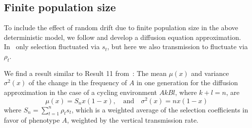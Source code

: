 \documentclass[12pt]{extarticle} %
\makeatletter
\renewcommand\section{\@startsection {section}{1}{\z@}%
     {-2.5ex \@plus -1ex \@minus -.2ex}%
     {1.3ex \@plus.2ex}%
    {\Large\bfseries}}
\makeatother
\begin{document}
\subsection*{Finite population size}

To include the effect of random drift due to finite population size in the above deterministic model, we follow \citet{Ram2018} and develop a diffusion equation approximation.
In~\citet{Ram2018} only selection fluctuated via $s_t$, but here we also transmission to fluctuate via $\rho_t$. 

We find a result similar to Result 11 from~\citet{Ram2018}:
The mean $\mu(x)$ and variance $\sigma^2(x)$ of the change in the frequency of $A$ in one generation for the diffusion approximation in the case of a cycling environment $AkBl$, where $k+l=n$, are
\begin{equation}
\mu(x) = S_n x(1-x), \quad \text{and} \quad \sigma^2(x) = n x (1-x)
\end{equation}
where $S_n = \sum_{t=1}^{n}{\rho_t s_t}$, which is a weighted average of the selection coefficients in favor of phenotype $A$, weighted by the vertical transmission rate.



%


%

\end{document}
